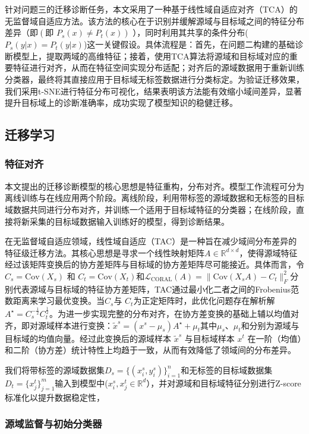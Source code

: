 \documentclass[a4paper]{CPIPC}
\numberwithin{equation}{section}
\begin{document}
针对问题三的迁移诊断任务，本文采用了一种基于线性域自适应对齐（TCA）的无监督域自适应方法。该方法的核心在于识别并缓解源域与目标域之间的特征分布差异（即$(\text{即 } P_s(x) \neq P_t(x))$ ），同时利用其共享的条件分布($P_s(y|x) = P_t(y|x)$)这一关键假设。具体流程是：首先，在问题二构建的基础诊断模型上，提取两域的高维特征；接着，使用TCA算法将源域和目标域对应的重要特征进行对齐，从而在特征空间实现分布适配；对齐后的源域数据用于重新训练分类器，最终将其直接应用于目标域无标签数据进行分类标定。为验证迁移效果，我们采用t-SNE进行特征分布可视化，结果表明该方法能有效缩小域间差异，显著提升目标域上的诊断准确率，成功实现了模型知识的稳健迁移\cite{ref6}。

\subsection{迁移学习}
\subsubsection{特征对齐}
本文提出的迁移诊断模型的核心思想是特征重构，分布对齐。模型工作流程可分为离线训练与在线应用两个阶段。离线阶段，利用带标签的源域数据和无标签的目标域数据共同进行分布对齐，并训练一个适用于目标域特征的分类器；在线阶段，直接将新采集的目标域数据输入训练好的模型，得到诊断结果。

在无监督域自适应领域，线性域自适应（TAC）是一种旨在减少域间分布差异的特征级迁移方法。其核心思想是寻求一个线性映射矩阵$ A \in \mathbb{R}^{d \times d} $，使得源域特征经过该矩阵变换后的协方差矩阵与目标域的协方差矩阵尽可能接近。具体而言，令$ C_s = \text{Cov}(X_s) $ 和 $ C_t = \text{Cov}(X_t) $和$ \mathcal{L}_{\text{CORAL}}(A) = \|\text{Cov}(X_s A) - C_t\|_F^2 $分别代表源域与目标域的特征协方差矩阵，TAC通过最小化二者之间的Frobenius范数距离来学习最优变换。当$C_s$与 $C_t$为正定矩阵时，此优化问题存在解析解$ A^\star = C_s^{-\frac{1}{2}} C_t^{\frac{1}{2}} $。为进一步实现完整的分布对齐，在协方差变换的基础上辅以均值对齐，即对源域样本进行变换：$ \tilde{x}^s = (x^s - \mu_s) A^\star + \mu_t $其中$\mu_s$、$\mu_t$和分别为源域与目标域的均值向量。经过此变换后的源域样本 $\tilde{x}^s$
与目标域样本 $x^t$
在一阶（均值）和二阶（协方差）统计特性上均趋于一致，从而有效降低了领域间的分布差异。


我们将带标签的源域数据集$ D_s = \{(x_i^s, y_i^s)\}_{i=1}^{n} $和无标签的目标域数据集$ D_t = \{x_j^t\}_{j=1}^{m} $输入到模型中($ x_i^s, x_j^t \in \mathbb{R}^d $），并对源域和目标域特征分别进行Z-score标准化以提升数据稳定性，

\subsubsection{源域监督与初始分类器}
\end{document}
